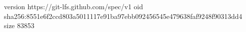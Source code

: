 version https://git-lfs.github.com/spec/v1
oid sha256:8551e6f2ccd803a5011117e91ba97ebb092456545e479638faf9248f90313dd4
size 83853
